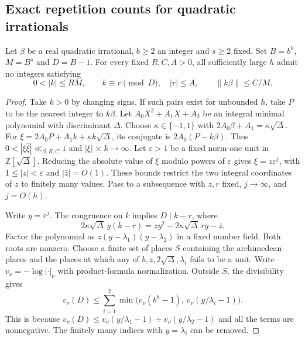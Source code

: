 \subsection{Exact repetition counts for quadratic irrationals}

\begin{lemma}\label{lem:pellresidue}
Let $\beta$ be a real quadratic irrational, $b\ge2$ an integer and $s\ge2$ fixed. Set $B=b^h$, $M=B^s$ and $D=B-1$. For every fixed $R,C,A>0$, all sufficiently large $h$ admit no integers satisfying
\[
 0<|k|\le RM,\qquad k\equiv r\pmod D,\quad |r|\le A,
 \qquad \|k\beta\|\le C/M.
\]
\end{lemma}

\begin{proof}
Take $k>0$ by changing signs. If such pairs exist for unbounded $h$, take $P$ to be the nearest integer to $k\beta$. Let $A_0X^2+A_1X+A_2$ be an integral minimal polynomial with discriminant $\Delta$. Choose $\kappa\in\{-1,1\}$ with $2A_0\beta+A_1=\kappa\sqrt\Delta$. For $\xi=2A_0P+A_1k+\kappa k\sqrt\Delta$, its conjugate is $2A_0(P-k\beta)$. Thus $0<|\xi\bar\xi|\ll_{\beta,R,C}1$ and $|\xi|\asymp k\to\infty$. Let $\varepsilon>1$ be a fixed norm-one unit in $\mathbb Z[\sqrt\Delta]$. Reducing the absolute value of $\xi$ modulo powers of $\varepsilon$ gives $\xi=z\varepsilon^j$, with $1\le|z|<\varepsilon$ and $|\bar z|=O(1)$. These bounds restrict the two integral coordinates of $z$ to finitely many values. Pass to a subsequence with $z,r$ fixed, $j\to\infty$, and $j=O(h)$.

Write $y=\varepsilon^j$. The congruence on $k$ implies $D\mid k-r$, where
\[
 2\kappa\sqrt\Delta\, y(k-r)=zy^2-2\kappa\sqrt\Delta\, r y-\bar z.
\]
Factor the polynomial as $z(y-\lambda_1)(y-\lambda_2)$ in a fixed number field. Both roots are nonzero. Choose a finite set of places $S$ containing the archimedean places and the places at which any of $b,z,2\sqrt\Delta,\lambda_i$ fails to be a unit. Write $v_\nu=-\log|\cdot|_\nu$ with product-formula normalization. Outside $S$, the divisibility gives
\[
 v_\nu(D)\le \sum_{i=1}^2
         \min\bigl(v_\nu(b^h-1),\,v_\nu(y/\lambda_i-1)\bigr).
\]
This is because $v_\nu(D)\le v_\nu(y/\lambda_1-1)+v_\nu(y/\lambda_2-1)$ and all the terms are nonnegative. The finitely many indices with $y=\lambda_i$ can be removed.


\end{proof}
